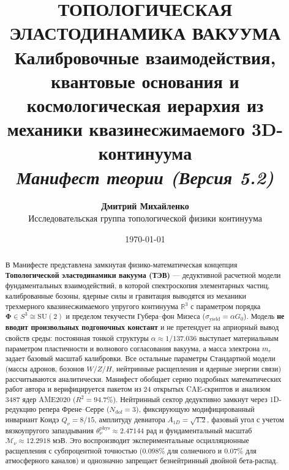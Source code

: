 \documentclass[11pt,a4paper]{article}
\theoremstyle{definition}
\theoremstyle{remark}
\begin{document}
\title{\textbf{\Large ТОПОЛОГИЧЕСКАЯ ЭЛАСТОДИНАМИКА ВАКУУМА}\\[2mm]
\large Калибровочные взаимодействия, квантовые основания и космологическая иерархия из механики квазинесжимаемого 3D-континуума\\[2mm]
\normalsize \textit{Манифест теории (Версия 5.2)}}

\author{\textbf{Дмитрий Михайленко}\\[1mm]
\small Исследовательская группа топологической физики континуума}

\date{\today}

\maketitle

\begin{abstract}
\noindent В Манифесте представлена замкнутая физико-математическая концепция \textbf{Топологической эластодинамики вакуума (ТЭВ)} --- дедуктивной расчетной модели фундаментальных взаимодействий, в которой спектроскопия элементарных частиц, калиброванные бозоны, ядерные силы и гравитация выводятся из механики трехмерного квазинесжимаемого упругого континуума $\mathbb{R}^3$ с параметром порядка $\boldsymbol{\Phi} \in S^3 \cong \mathrm{SU}(2)$ и пределом текучести Губера--фон Мизеса ($\sigma_{\mathrm{yield}} = \alpha G_0$).
\vspace{2mm}
\noindent Модель \textbf{не вводит произвольных подгоночных констант} и не претендует на априорный вывод свойств среды: постоянная тонкой структуры $\alpha \approx 1/137.036$ выступает материальным параметром пластичности и волнового согласования вакуума, а масса электрона $m_e$ задает базовый масштаб калибровки. Все остальные параметры Стандартной модели (массы адронов, бозонов $W/Z/H$, 
нейтринные расщепления и ядерные энергии связи) рассчитываются аналитически. Манифест обобщает серию подробных математических работ автора и верифицируется пакетом из 24 открытых CAE-скриптов и анализом 3487 ядер AME2020 ($R^2 = 94.7\%$).
Нейтринный сектор дедуктивно замкнут через 1D-редукцию репера Френе--Серре ($N_{\text{dof}} = 3$), 
фиксирующую модифицированный инвариант Коидэ $Q_\nu = 8/15$, амплитуду девиатора $A_{1D} = \sqrt{1.2}$, 
фазовый угол с учетом вязкоупругого запаздывания $\theta_\nu^{\text{phys}} \approx 2.47144$ рад 
и фундаментальный масштаб $\mathcal{M}_\nu \approx 12.2918$ мэВ. Это воспроизводит экспериментальные 
осцилляционные расщепления с субпроцентной точностью ($0.098\%$ для солнечного и $0.07\%$ для 
атмосферного каналов) и однозначно запрещает безнейтринный двойной бета-распад.
\end{abstract}
\end{document}

